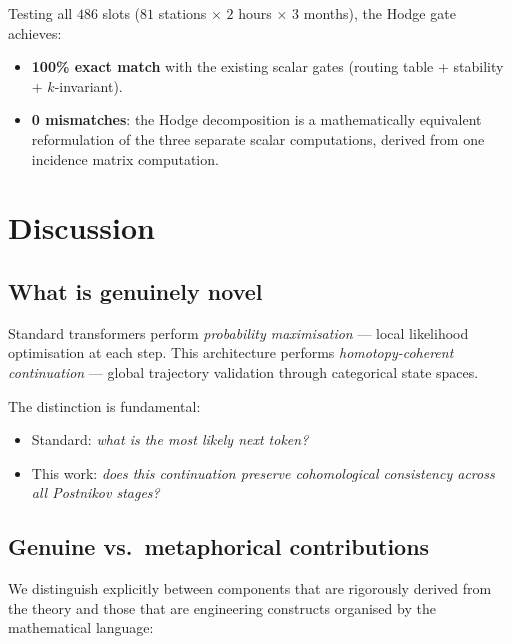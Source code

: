 \documentclass[11pt,a4paper]{article}
\begin{document}
Testing all $486$ slots ($81$ stations $\times$ $2$ hours $\times$
$3$ months), the Hodge gate achieves:
\begin{itemize}
  \item \textbf{100\% exact match} with the existing scalar gates
        (routing table + stability + $k$-invariant).
  \item \textbf{0 mismatches}: the Hodge decomposition is a
        mathematically equivalent reformulation of the three
        separate scalar computations, derived from one incidence
        matrix computation.
\end{itemize}

\section{Discussion}

\subsection{What is genuinely novel}

Standard transformers perform \emph{probability maximisation} ---
local likelihood optimisation at each step. This architecture
performs \emph{homotopy-coherent continuation} --- global
trajectory validation through categorical state spaces.

The distinction is fundamental:
\begin{itemize}
  \item Standard: \emph{what is the most likely next token?}
  \item This work: \emph{does this continuation preserve
        cohomological consistency across all Postnikov stages?}
\end{itemize}

\subsection{Genuine vs.\ metaphorical contributions}

We distinguish explicitly between components that are
rigorously derived from the theory and those that are
engineering constructs organised by the mathematical language:
\end{document}
